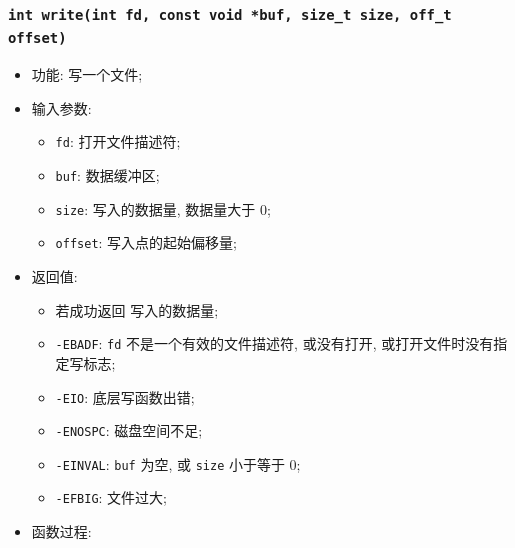 \documentclass[nofonts, titlepage]{ctexart}
\begin{document}
  \subsubsection[\texttt{write}]{\texttt{int write(int fd, const void *buf, size\_t size, off\_t offset)}}
  \begin{itemize}
\item
  功能: 写一个文件;
\item
  输入参数:

  \begin{itemize}
  \item
    \texttt{fd}: 打开文件描述符;
  \item
    \texttt{buf}: 数据缓冲区;
  \item
    \texttt{size}: 写入的数据量, 数据量大于 0;
  \item
    \texttt{offset}: 写入点的起始偏移量;
  \end{itemize}
\item
  返回值:

  \begin{itemize}
  \item
    若成功返回 写入的数据量;
  \item
    \texttt{-EBADF}: \texttt{fd} 不是一个有效的文件描述符, 或没有打开,
    或打开文件时没有指定写标志;
  \item
    \texttt{-EIO}: 底层写函数出错;
  \item
    \texttt{-ENOSPC}: 磁盘空间不足;
  \item
    \texttt{-EINVAL}: \texttt{buf} 为空, 或 \texttt{size} 小于等于 0;
  \item
    \texttt{-EFBIG}: 文件过大;
  \end{itemize}
\item
  函数过程:


\end{itemize}
\end{document}
